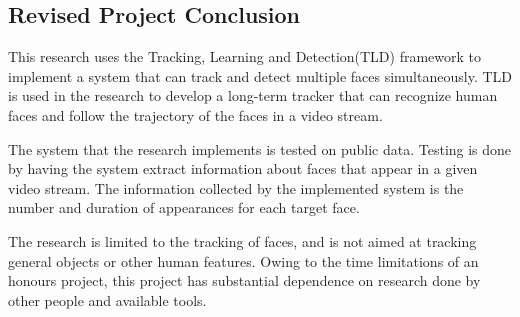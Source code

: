 \subsection{Revised Project Conclusion}
This research uses the Tracking, Learning and Detection(TLD) framework to implement a system that can track and detect multiple faces simultaneously.
TLD is used in the research to develop a long-term tracker that can recognize human faces and follow the trajectory of the faces in a video stream.

The system that the research implements is tested on public data.
Testing is done by having the system extract information about faces that appear in a given video stream.
The information collected by the implemented system is the number and duration of appearances for each target face. 

The research is limited to the tracking of faces, and is not aimed at tracking general objects or other human features.
Owing to the time limitations of an honours project, this project has substantial dependence on research done by other people and available tools.
